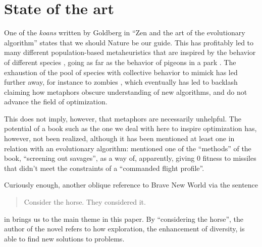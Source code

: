 \section{State of the art}


One of the {\em koans} written by Goldberg in ``Zen and the art of the
evolutionary algorithm'' states that we should Nature be our guide. This has
profitably led to many different population-based metaheuristics that are
inspired by the behavior of different species \cite{nedjah2020inspiration}, going as far as the behavior of
pigeons in a park \cite{blanco2019urban}. The exhaustion of the pool of
species with collective behavior to mimick has led further away, for instance to
zombies \cite{nguyen2012zombie}, which eventually has led to backlash
\cite{metaphor_exposed} claiming how metaphors obscure understanding of new
algorithms, and do not advance the field of optimization.

This does not imply, however, that metaphors are necessarily
unhelpful. The potential of a book such as the one we deal with here to inspire
optimization has, however, not been realized, although it has been
mentioned at least one in relation with an evolutionary algorithm:
\cite{wollam1999reverse} mentioned one of the ``methods'' of the book,
``screening out savages'', as a way of, apparently, giving 0 fitness
to missiles that didn't meet the constraints of a ``commanded flight
profile''.

Curiously enough, another oblique reference to Brave New World via the
sentence
\begin{quote}
  Consider the horse. They considered it.
  \end{quote}
in \cite{DBLP:journals/corr/abs-2107-00314} brings us to the main
theme in this paper. By ``considering the horse'', the author of the
novel refers to how exploration, the enhancement of diversity, is able
to find new solutions to problems.


